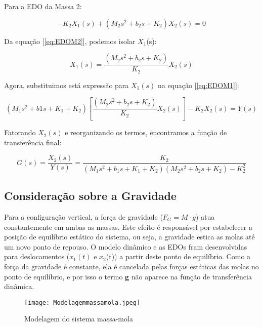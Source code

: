 \documentclass[9pt,a4paper,twocolumn,twoside]{tau-class/tau}
\begin{document}
Para a EDO da Massa 2:

\begin{equation}
    -K_2X_1(s) + (M_2s^2 + b_2s + K_2)X_2(s) = 0
    \label{eq:EDOM2}
\end{equation}

Da equação [\ref{eq:EDOM2}], podemos isolar $X_1$(s):

\begin{equation}
    X_1(s) = \frac{(M_2s^2 + b_2s + K_2)}{K_2}X_2(s)
    \label{eq:X1iso}
\end{equation}

Agora, substituimos está expressão para $X_1(s)$ na equação [\ref{eq:EDOM1}]:

\begin{equation}
    (M_1s^2 + b1s + K_1 + K_2)\left[\frac{(M_2s^2 + b_2s + K_2)}{K_2}X_2(s)\right] - K_2X_2(s) = Y(s)
    \label{eq:substX1}
\end{equation}

Fatorando $X_2(s)$ e reorganizando os termos, encontramos a função de transferência final:

\begin{equation}
    G(s) = \frac{X_2 (s)}{Y(s)} = \frac{K_2}{(M_1 s^2 + b_1 s + K_1 + K_2)(M_2 s^2 + b_2 s + K_2) - K_2 ^2}
\label{eq: FT}
\end{equation}

\subsection{Consideração sobre a Gravidade}

Para a configuração vertical, a força de gravidade ($F_G = M \cdot g$) atua constantemente em ambas as massas. Este efeito é responsável por estabelecer a posição de equilíbrio estático do sistema, ou seja, a gravidade estica as molas até um novo ponto de repouso. O modelo dinâmico e as EDOs fram desenvolvidas para deslocamentos ($x_1(t)$ e $x_2$(t)) a partir deste ponto de equilíbrio. Como a força da gravidade é constante, ela é cancelada pelas forças estáticas das molas no ponto de equilíbrio, e por isso o termo \textbf{g} não aparece na função de transferência dinâmica.


\begin{figure}[H]
    \centering
    \texttt{[image: Modelagemmassamola.jpeg]}
    \caption{Modelagem do sistema massa-mola}
    \label{fig:MSM}
\end{figure}
\end{document}
